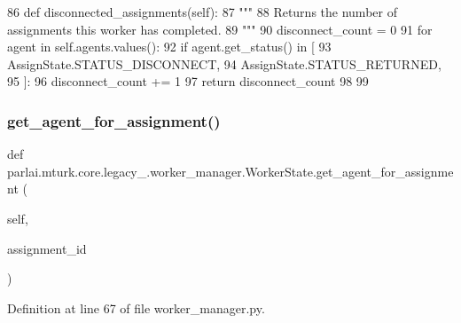 \begin{DoxyCode}
86     \textcolor{keyword}{def }disconnected\_assignments(self):
87         \textcolor{stringliteral}{"""}
88 \textcolor{stringliteral}{        Returns the number of assignments this worker has completed.}
89 \textcolor{stringliteral}{        """}
90         disconnect\_count = 0
91         \textcolor{keywordflow}{for} agent \textcolor{keywordflow}{in} self.agents.values():
92             \textcolor{keywordflow}{if} agent.get\_status() \textcolor{keywordflow}{in} [
93                 AssignState.STATUS\_DISCONNECT,
94                 AssignState.STATUS\_RETURNED,
95             ]:
96                 disconnect\_count += 1
97         \textcolor{keywordflow}{return} disconnect\_count
98 
99 
\end{DoxyCode}
\mbox{\label{classparlai_1_1mturk_1_1core_1_1legacy__2018_1_1worker__manager_1_1WorkerState_af5d8f601efd7223f5b2d91b2df3582e2}} 
\subsubsection{\texorpdfstring{get\+\_\+agent\+\_\+for\+\_\+assignment()}{get\_agent\_for\_assignment()}}
{\footnotesize\ttfamily def parlai.\+mturk.\+core.\+legacy\+\_.\+worker\+\_\+manager.\+Worker\+State.\+get\+\_\+agent\+\_\+for\+\_\+assignment (\begin{DoxyParamCaption}\item[{}]{self,  }\item[{}]{assignment\+\_\+id }\end{DoxyParamCaption})}



Definition at line 67 of file worker\+\_\+manager.\+py.


